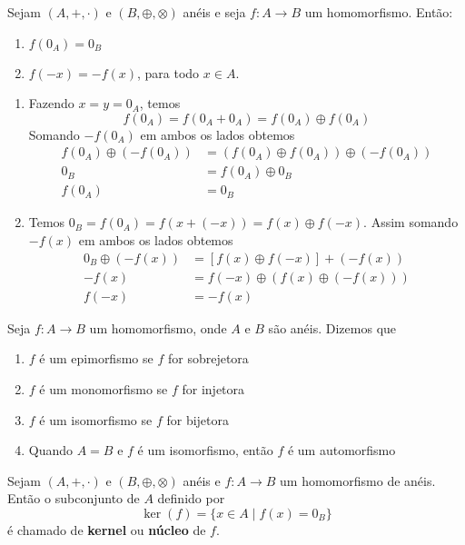 \begin{proposicao}
	Sejam $(A, +, \cdot)$ e $(B, \oplus, \otimes)$ an\'eis e seja $f : A \to B$ um homomorfismo. Ent{\~a}o:
	\begin{enumerate}[label={\roman*})]
		\item $f(0_{A}) = 0_{B}$
		\item $f(-x) = -f(x)$, para todo $x \in A$.
	\end{enumerate}
\end{proposicao}
\begin{prova}
	\begin{enumerate}[label={\roman*})]
		\item Fazendo $x = y = 0_{A}$, temos
		\[
			f(0_A) = f(0_A + 0_A) = f(0_A) \oplus f(0_A)
		\]
		Somando $-f(0_A)$ em ambos os lados obtemos
		\begin{align*}
			f(0_A) \oplus (-f(0_A)) &= (f(0_A)\oplus f(0_A)) \oplus (-f(0_A))\\
			0_B &= f(0_A) \oplus 0_B\\
			f(0_A) &= 0_B
		\end{align*}

		\item Temos $0_B = f(0_A) = f(x + (-x)) = f(x)\oplus f(-x)$. Assim somando $-f(x)$ em ambos os lados obtemos
		\begin{align*}
			0_B\oplus(-f(x)) &= [f(x)\oplus f(-x)] + (-f(x))\\
			-f(x) &= f(-x) \oplus (f(x) \oplus (-f(x)))\\
			f(-x) &= -f(x)
		\end{align*}
	\end{enumerate}
\end{prova}

\begin{definicao}Seja $f:A\rightarrow B$ um homomorfismo, onde $A$ e $B$ s{\~a}o an{\'e}is. Dizemos que
	\begin{enumerate}[label={\roman*})]
		\item $f$ {\'e} um epimorfismo se $f$ for sobrejetora
		\item $f$ {\'e} um monomorfismo se $f$ for injetora
		\item $f$ {\'e} um isomorfismo se $f$ for bijetora
		\item Quando $A=B$ e $f$ {\'e} um isomorfismo, ent{\~a}o $f$ {\'e} um automorfismo
	\end{enumerate}
\end{definicao}

\begin{definicao}
	Sejam $(A, +, \cdot)$ e $(B, \oplus, \otimes)$ an\'eis e $f : A \to B$ um homomorfismo de an\'eis. Ent\~ao o subconjunto de $A$ definido por
	\[
		\ker(f) = \{ x \in A \mid f(x) = 0_B\}
	\]
	\'e chamado de \textbf{kernel} ou \textbf{n\'ucleo} de $f$.
\end{definicao}

